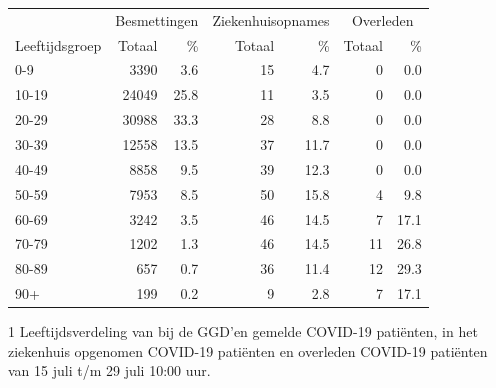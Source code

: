 \documentclass[
  english,
  man,floatsintext]{apa6}
\begin{document}
\begin{table}
\centering\begingroup\fontsize{11}{13}\selectfont

\begin{threeparttable}
\begin{tabular}{lrrrrrr}
\toprule
\multicolumn{1}{c}{ } & \multicolumn{2}{c}{Besmettingen} & \multicolumn{2}{c}{Ziekenhuisopnames} & \multicolumn{2}{c}{Overleden} \\
\cmidrule(l{3pt}r{3pt}){2-3} \cmidrule(l{3pt}r{3pt}){4-5} \cmidrule(l{3pt}r{3pt}){6-7}
Leeftijdsgroep & Totaal & \% & Totaal & \% & Totaal & \%\\
\midrule
0-9 & 3390 & 3.6 & 15 & 4.7 & 0 & 0.0\\
10-19 & 24049 & 25.8 & 11 & 3.5 & 0 & 0.0\\
20-29 & 30988 & 33.3 & 28 & 8.8 & 0 & 0.0\\
30-39 & 12558 & 13.5 & 37 & 11.7 & 0 & 0.0\\
40-49 & 8858 & 9.5 & 39 & 12.3 & 0 & 0.0\\
50-59 & 7953 & 8.5 & 50 & 15.8 & 4 & 9.8\\
60-69 & 3242 & 3.5 & 46 & 14.5 & 7 & 17.1\\
70-79 & 1202 & 1.3 & 46 & 14.5 & 11 & 26.8\\
80-89 & 657 & 0.7 & 36 & 11.4 & 12 & 29.3\\
90+ & 199 & 0.2 & 9 & 2.8 & 7 & 17.1\\
\bottomrule
\end{tabular}
\begin{tablenotes}
\item[1] Leeftijdsverdeling van bij de GGD’en gemelde COVID-19 patiënten, in het ziekenhuis opgenomen COVID-19 patiënten en overleden COVID-19 patiënten van 15 juli t/m 29 juli 10:00 uur.
\end{tablenotes}
\end{threeparttable}
\endgroup{}
\end{table}

\newpage
\end{document}
